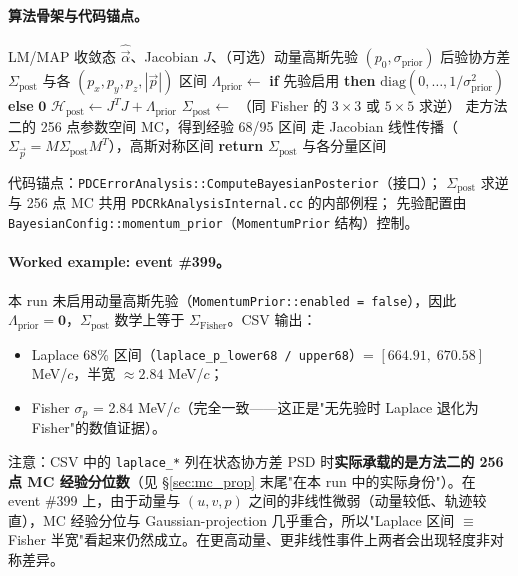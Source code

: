 \documentclass[a4paper, 11pt]{article}
\begin{document}
\paragraph{算法骨架与代码锚点。}

\begin{algorithm}[H]
\caption{方法四：Laplace 后验协方差}
\label{alg:laplace}
\begin{algorithmic}[1]
\Require LM/MAP 收敛态 $\hat{\vec{\alpha}}$、Jacobian $J$、（可选）动量高斯先验 $(p_0, \sigma_\mathrm{prior})$
\Ensure 后验协方差 $\Sigma_\mathrm{post}$ 与各 $(p_x, p_y, p_z, |\vec{p}|)$ 区间
\State $\Lambda_\mathrm{prior} \gets$ \textbf{if} 先验启用 \textbf{then} $\mathrm{diag}(0, \dots, 1/\sigma_\mathrm{prior}^2)$ \textbf{else} $\mathbf{0}$
\State $\mathcal{H}_\mathrm{post} \gets J^T J + \Lambda_\mathrm{prior}$
\State $\Sigma_\mathrm{post} \gets$ （同 Fisher 的 $3{\times}3$ 或 $5{\times}5$ 求逆）
  \State 走方法二的 256 点参数空间 MC，得到经验 68/95 区间
\Else
  \State 走 Jacobian 线性传播（$\Sigma_{\vec{p}} = M \Sigma_\mathrm{post} M^T$），高斯对称区间
\EndIf
\State \textbf{return} $\Sigma_\mathrm{post}$ 与各分量区间
\end{algorithmic}
\end{algorithm}

代码锚点：\texttt{PDCErrorAnalysis::ComputeBayesianPosterior}（接口）；
$\Sigma_\mathrm{post}$ 求逆与 256 点 MC 共用 \texttt{PDCRkAnalysisInternal.cc} 的内部例程；
先验配置由 \texttt{BayesianConfig::momentum\_prior}（\texttt{MomentumPrior} 结构）控制。

\paragraph{Worked example: event \#399。}
本 run 未启用动量高斯先验（\texttt{MomentumPrior::enabled = false}），因此 $\Lambda_\mathrm{prior} = \mathbf{0}$，$\Sigma_\mathrm{post}$ 数学上等于 $\Sigma_\mathrm{Fisher}$。CSV 输出：

\begin{itemize}[nosep]
  \item Laplace 68\% 区间（\texttt{laplace\_p\_lower68 / upper68}）= $[664.91,\;670.58]$ MeV/$c$，半宽 $\approx 2.84$ MeV/$c$；
  \item Fisher $\sigma_p$ = 2.84 MeV/$c$（完全一致——这正是"无先验时 Laplace 退化为 Fisher"的数值证据）。
\end{itemize}

注意：CSV 中的 \texttt{laplace\_*} 列在状态协方差 PSD 时\textbf{实际承载的是方法二的 256 点 MC 经验分位数}（见 §\ref{sec:mc_prop} 末尾"在本 run 中的实际身份"）。在 event \#399 上，由于动量与 $(u,v,p)$ 之间的非线性微弱（动量较低、轨迹较直），MC 经验分位与 Gaussian-projection 几乎重合，所以"Laplace 区间 $\equiv$ Fisher 半宽"看起来仍然成立。在更高动量、更非线性事件上两者会出现轻度非对称差异。
\end{document}
